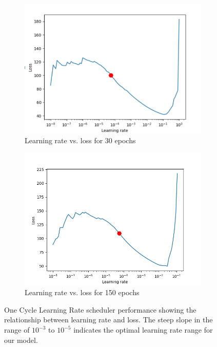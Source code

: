 \documentclass{article}
\begin{document}
\begin{figure}[h]
  \centering
  \begin{subfigure}{0.48\textwidth}
    \centering
    \includegraphics[width=\linewidth]{learningRate30.png}
    \caption{Learning rate vs. loss for 30 epochs}
    \label{fig:lr_30}
  \end{subfigure}
  \hfill
  \begin{subfigure}{0.48\textwidth}
    \centering
    \includegraphics[width=\linewidth]{learningRate150.png}
    \caption{Learning rate vs. loss for 150 epochs}
    \label{fig:lr_150}
  \end{subfigure}
  \caption{One Cycle Learning Rate scheduler performance showing the relationship between learning rate and loss. The steep slope in the range of $10^{-3}$ to $10^{-5}$ indicates the optimal learning rate range for our model.}
  \label{fig:lr_loss}
  \end{figure}
  
\end{document}
